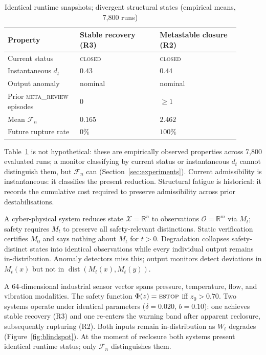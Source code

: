 \documentclass{llncs}
\DeclareMathOperator{\dist}{dist}
\newcommand{\st}[1]{\textup{\textsc{#1}}}
\begin{document}
\begin{table}[tbp]
\centering
\caption{Identical runtime snapshots; divergent structural states
  (empirical means, 7,800 runs)}
\label{tab:hidden}
\footnotesize
\begin{tabular}{@{}p{0.28\linewidth}p{0.31\linewidth}p{0.31\linewidth}@{}}
\toprule
\textbf{Property} & \textbf{Stable recovery (R3)} & \textbf{Metastable closure (R2)} \\
\midrule
Current status                   & \st{closed} & \st{closed} \\
Instantaneous $d_t$              & $0.43$      & $0.44$ \\
Output anomaly                   & nominal     & nominal \\
Prior \st{meta\_review} episodes & $0$         & ${\geq}1$ \\
Mean $\mathcal{F}_n$             & $0.165$     & $2.462$ \\
Future rupture rate              & $0\%$       & $100\%$ \\
\bottomrule
\end{tabular}
\end{table}

Table~\ref{tab:hidden} is not hypothetical: these are empirically
observed properties across 7,800 evaluated runs; a monitor classifying
by current status or instantaneous $d_t$ cannot distinguish them, but
$\mathcal{F}_n$ can (Section~\ref{sec:experiments}).
Current admissibility is instantaneous: it classifies the present
reduction. Structural fatigue is historical: it records the cumulative
cost required to preserve admissibility across prior destabilisations.

A cyber-physical system reduces state $\mathcal{X} = \mathbb{R}^n$ to
observations $\mathcal{O} = \mathbb{R}^m$ via $M_t$; safety requires
$M_t$ to preserve all safety-relevant distinctions. Static verification
certifies $M_0$ and says nothing about $M_t$ for $t > 0$. Degradation
collapses safety-distinct states into identical observations while every
individual output remains in-distribution. Anomaly detectors miss this;
output monitors detect deviations in $M_t(x)$ but not in
$\dist(M_t(x), M_t(y))$.

\begin{example}
\label{ex:valve}
A 64-dimensional industrial sensor vector spans pressure, temperature,
flow, and vibration modalities. The safety function $\Phi(z) = \st{estop}$
iff $z_0 > 0.70$. Two systems operate under identical parameters
($\delta = 0.020$, $b = 0.10$): one achieves stable recovery (R3) and
one re-enters the warning band after apparent reclosure, subsequently
rupturing (R2). Both inputs remain in-distribution as $W_t$ degrades
(Figure~\ref{fig:blindspot}). At the moment of reclosure both systems
present identical runtime status; only $\mathcal{F}_n$ distinguishes
them.
\end{example}
\end{document}
